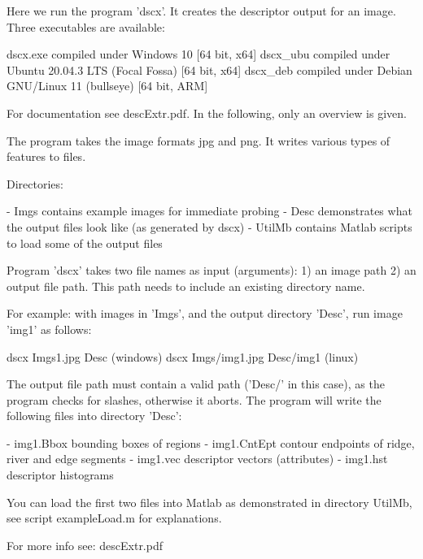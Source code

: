 Here we run the program 'dscx'. It creates the descriptor output for an image. Three
executables are available:

dscx.exe    compiled under Windows 10                       [64 bit, x64]
dscx_ubu    compiled under Ubuntu 20.04.3 LTS (Focal Fossa) [64 bit, x64]
dscx_deb    compiled under Debian GNU/Linux 11 (bullseye)   [64 bit, ARM]

For documentation see descExtr.pdf. In the following, only an overview is given.

The program takes the image formats jpg and png. It writes various types of features
to files.

Directories: 

- Imgs	 contains example images for immediate probing
- Desc   demonstrates what the output files look like (as generated by dscx) 
- UtilMb contains Matlab scripts to load some of the output files

Program 'dscx' takes two file names as input (arguments):
   1) an image path
   2) an output file path. This path needs to include an existing directory name.

For example: with images in 'Imgs', and the output directory 'Desc', run image 'img1'
as follows:

   dscx Imgs\img1.jpg Desc	   (windows)
   dscx Imgs/img1.jpg Desc/img1	   (linux)

The output file path must contain a valid path ('Desc/' in this case), as the
program checks for slashes, otherwise it aborts. The program will write the
following files into directory 'Desc':

    - img1.Bbox	    bounding boxes of regions
    - img1.CntEpt   contour endpoints of ridge, river and edge segments 
    - img1.vec	    descriptor vectors (attributes)
    - img1.hst	    descriptor histograms

You can load the first two files into Matlab as demonstrated in directory UtilMb,
see script exampleLoad.m for explanations.

For more info see: descExtr.pdf



